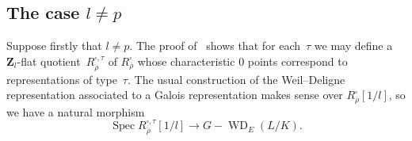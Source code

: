 \documentclass{amsart}
\renewcommand{\mathbb}{\mathbf}
\renewcommand{\ell}{l}
\theoremstyle{definition}
\theoremstyle{remark}
\newcommand{\mar}[1]{}
\newcommand{\mar}[1]{\marginpar{\raggedright\tiny squirrel #1}}
\newcommand{\Z}{\ZZ}
\newcommand{\ZZ}{{\mathbb Z}}
\newcommand{\Zl}{\Z_{\ell}}
\DeclareMathOperator{\Gal}{Gal}
\DeclareMathOperator{\Spec}{Spec}
\DeclareMathOperator{\WD}{WD}
\newcommand{\rhobar}{\overline{\rho}}
\begin{document}
\subsection{The case $l\neq p$} Suppose firstly that $l\ne p$. The proof of~\cite[Prop.\ 3.0.12]{MR3152673} shows that for
each~$\tau$ we may define a $\Zl$-flat
quotient~$R_{\rhobar}^{\square,\tau}$ of $R_{\rhobar}^\square$ whose characteristic $0$ points correspond to
representations of type~$\tau$.
The usual construction of the Weil--Deligne
representation associated to a Galois representation makes sense over
$R_{\rhobar}^{\square}[1/l]$, so %
we have a natural morphism 
\[ \Spec R_{\rhobar}^{\square,\tau}[1/l]\to G-\WD_E(L/K). \]



\end{document}

